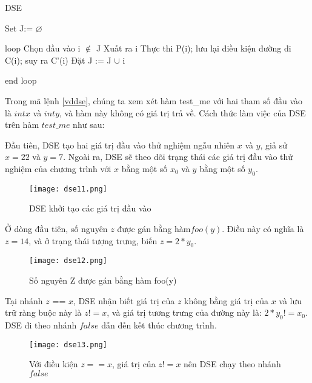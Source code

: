 \begin{algorithm}
	\caption{DSE}
	\begin{algorithmic}	
		\item Set J:= $\varnothing $ 
		\item loop
			\subitem Chọn đầu vào i $\notin $ J 
			\subitem Xuất ra i
			\subitem Thực thi P(i); lưu lại điều kiện đường đi C(i); suy ra C'(i)
			\subitem Đặt J := J $\cup $ i			
		\item end loop
	\end{algorithmic}
\end{algorithm}


	
Trong mã lệnh \ref{vddse}, chúng ta xem xét hàm test\_me với hai tham số đầu vào là $int x$ và $int y$, và hàm này không có giá trị trả về. Cách thức làm việc của DSE trên hàm $test\_me$ như sau: 

Đầu tiên, DSE tạo hai giá trị đầu vào thử nghiệm ngẫu nhiên $x$ và $y$, giả sử $x = 22$ và $y = 7$. Ngoài ra, DSE sẽ theo dõi trạng thái các giá trị đầu vào thử nghiệm của chương trình với $x$ bằng một số $x_{0}$ và $y$ bằng một số $y_{0}$.
\begin{center}
	\begin{figure}[H]
		\begin{center}
			\texttt{[image: dse11.png]}
		\end{center}
		\caption{DSE khởi tạo các giá trị đầu vào}
		\label{dse11}
	\end{figure}
\end{center}
Ở dòng đầu tiên, số nguyên $z$ được gán bằng hàm$foo(y)$. Điều này có nghĩa là $z = 14$, và ở trạng thái tượng trưng, biến $ z = 2*y_{0} $. 
\begin{center}
	\begin{figure}[H]
		\begin{center}
			\texttt{[image: dse12.png]}
		\end{center}
		\caption{Số nguyên Z được gán bằng hàm foo(y)}
		\label{dse12}
	\end{figure}
\end{center}

Tại nhánh $z$ == $x$, DSE nhận biết giá trị của $z$ không bằng giá trị của $x$ và lưu trữ ràng buộc này là $z != x$, và giá trị tương trưng của đường này là: $ 2*y_{0} != x_{0} $. DSE đi theo nhánh $false$ dẫn đến kết thúc chương trình.
\begin{center}
	\begin{figure}[H]
		\begin{center}
			\texttt{[image: dse13.png]}
		\end{center}
		\caption{Với điều kiện $z == x$, giá trị của  $z != x$ nên DSE chạy theo nhánh $false$  }
		\label{dse13}
	\end{figure}
\end{center}

